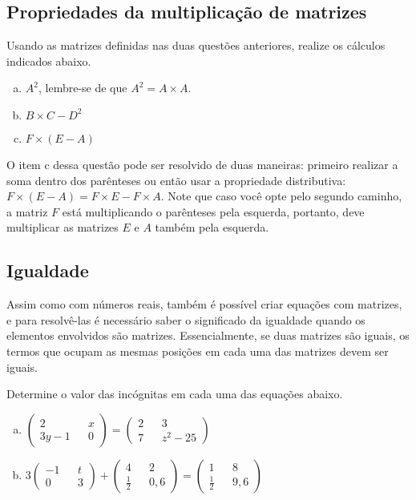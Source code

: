 \documentclass[main_estudante.tex]{subfiles}
\begin{document}
\subsection*{Propriedades da multiplicação de matrizes}

\begin{questao}
Usando as matrizes definidas nas duas questões anteriores, realize os cálculos indicados abaixo.
\begin{enumerate}[a)]
\item $A^2$, lembre-se de que $A^2=A \times A$.
\item $B \times C - D^2$
\item $F \times (E-A)$ 
\end{enumerate}
\end{questao}

O item c dessa questão pode ser resolvido de duas maneiras: primeiro realizar a soma dentro dos parênteses ou então usar a propriedade distributiva: $F \times (E-A) = F \times E - F \times A$. Note que caso você opte pelo segundo caminho, a matriz $F$ está multiplicando o parênteses pela esquerda, portanto, deve multiplicar as matrizes $E$ e $A$ também pela esquerda.

\subsection*{Igualdade}

Assim como com números reais, também é possível criar equações com matrizes, e para resolvê-las  é necessário saber o significado da igualdade quando os elementos envolvidos são matrizes. Essencialmente, se duas matrizes são iguais, os termos que ocupam as mesmas posições em cada uma das matrizes devem ser iguais.

\begin{questao}
Determine o valor das incógnitas em cada uma das equações abaixo.
\begin{enumerate}[a)]
\item $\begin{pmatrix} 2 && x \\ 3y-1 && 0 \end{pmatrix} = \begin{pmatrix} 2 && 3 \\ 7 && z^2-25 \end{pmatrix}$
\item $ 3 \begin{pmatrix} -1 && t \\ 0 && 3 \end{pmatrix} + \begin{pmatrix} 4 && 2 \\ \frac{1}{2} && 0,6 \end{pmatrix} = \begin{pmatrix} 1 && 8 \\ \frac{1}{2} && 9,6 \end{pmatrix} $
\end{enumerate}
\end{questao}
\end{document}
